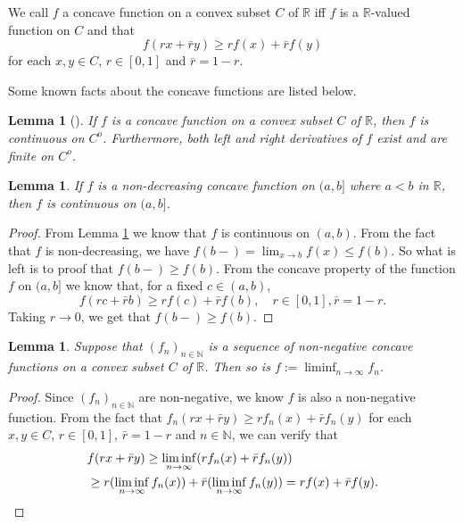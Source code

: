 \documentclass[12pt,a4paper]{amsart}
\numberwithin{equation}{section}
\theoremstyle{plain}
\newtheorem{lem}[thm]{Lemma}
\theoremstyle{definition}
\theoremstyle{remark}
\begin{document}
We call $f$ a concave function on a convex subset $C$ of $\mathbb R$ iff $f$ is a $\mathbb R$-valued function on $C$ and that
\[
  f(rx+\bar r y) \geq r f(x) + \bar r f(y)
\]
for each $x,y \in C$, $r \in [0,1]$ and $\bar r = 1 - r$. 

Some known facts about the concave functions are listed below.

\begin{lem}[{\cite[Corollary 6.3.3.]{Dudley2002Real}}]
  \label{lem:ACC}
	If $f$ is a concave function on a convex subset $C$ of $\mathbb R$, then $f$ is continuous on $C^o$.
 Furthermore, both left and right derivatives of $f$ exist and are finite on $C^o$.
\end{lem}

\begin{lem}
  \label{lem:ACR}
	If $f$ is a non-decreasing concave function on $(a,b]$ where $a<b$ in $\mathbb R$, then $f$ is continuous on $(a,b]$.
\end{lem}

\begin{proof}
From Lemma \ref{lem:ACC} we know that $f$ is continuous on $(a,b)$.
From the fact that $f$ is non-decreasing, we have $f(b-) = \lim_{x \to b} f(x) \leq f(b)$. 
So what is left is to proof that $f(b-) \geq f(b)$.
From the concave property of the function $f$ on $(a,b]$ we know that, for a fixed $c \in (a,b)$,
\[
f(rc + \bar r b) 
\geq r f(c) + \bar r f(b),
\quad r\in [0,1], \bar r = 1 - r.
\]
Taking $r\to 0$, we get that $f(b-)\geq f(b)$.
\end{proof}

\begin{lem}
	\label{lem:ACL}
  Suppose that $(f_n)_{n \in \mathbb N}$ is a sequence of non-negative concave functions on a convex subset $C$ of $\mathbb R$.
  Then so is $f:= \liminf_{n\to \infty} f_n$.
\end{lem}

\begin{proof}
  Since $(f_n)_{n \in \mathbb N}$ are non-negative, we know $f$ is also a non-negative function.
  From the fact that
\(
  f_n(rx+\bar r y) \geq r f_n(x) + \bar r f_n(y)
\)
for each $x,y\in C$, $r\in [0,1]$, $\bar r = 1 - r$ and $n \in \mathbb N$, we can verify that
\begin{align}
	& f(rx+ \bar r y) 
   \geq \liminf_{n\to \infty} (r f_n(x) + \bar r f_n(y))
   \\ & \geq r (\liminf_{n\to \infty} f_n(x)) + \bar r (\liminf_{n\to \infty} f_n(y)) 
    = rf(x) + \bar r f(y).
        \qedhere
\end{align}
\end{proof}
\end{document}
